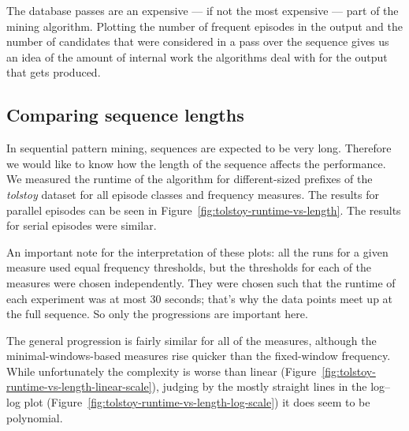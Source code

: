 The database passes are an expensive --- if not the most expensive --- part of the mining algorithm. Plotting the number of frequent episodes in the output and the number of candidates that were considered in a pass over the sequence gives us an idea of the amount of internal work the algorithms deal with for the output that gets produced.
\fi



\subsection{Comparing sequence lengths}

In sequential pattern mining, sequences are expected to be very long. Therefore we would like to know how the length of the sequence affects the performance. We measured the runtime of the algorithm for different-sized prefixes of the \emph{tolstoy} dataset for all episode classes and frequency measures. The results for parallel episodes can be seen in Figure~\ref{fig:tolstoy-runtime-vs-length}. The results for serial episodes were similar.

An important note for the interpretation of these plots: all the runs for a given measure used equal frequency thresholds, but the thresholds for each of the measures were chosen independently. They were chosen such that the runtime of each experiment was at most 30 seconds; that's why the data points meet up at the full sequence. So only the progressions are important here.

The general progression is fairly similar for all of the measures, although the minimal-windows-based measures rise quicker than the fixed-window frequency. While unfortunately the complexity is worse than linear (Figure~\ref{fig:tolstoy-runtime-vs-length-linear-scale}), judging by the mostly straight lines in the log--log plot (Figure~\ref{fig:tolstoy-runtime-vs-length-log-scale}) it does seem to be polynomial.



